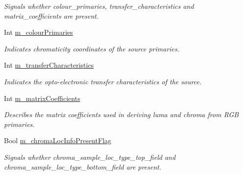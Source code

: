 \begin{DoxyCompactItemize}
\begin{DoxyCompactList}\small\item\em Signals whether colour\+\_\+primaries, transfer\+\_\+characteristics and matrix\+\_\+coefficients are present. \end{DoxyCompactList}\item 
\mbox{\label{class_t_enc_cfg_a280f8ebc530fa86353079d18fa54162c}} 
Int \hyperlink{class_t_enc_cfg_a280f8ebc530fa86353079d18fa54162c}{m\+\_\+colour\+Primaries}
\begin{DoxyCompactList}\small\item\em Indicates chromaticity coordinates of the source primaries. \end{DoxyCompactList}\item 
\mbox{\label{class_t_enc_cfg_af7e8035e2632c6a0cad7f54855f1dc1d}} 
Int \hyperlink{class_t_enc_cfg_af7e8035e2632c6a0cad7f54855f1dc1d}{m\+\_\+transfer\+Characteristics}
\begin{DoxyCompactList}\small\item\em Indicates the opto-\/electronic transfer characteristics of the source. \end{DoxyCompactList}\item 
\mbox{\label{class_t_enc_cfg_a857671642531f88fa45db9235cfac9dc}} 
Int \hyperlink{class_t_enc_cfg_a857671642531f88fa45db9235cfac9dc}{m\+\_\+matrix\+Coefficients}
\begin{DoxyCompactList}\small\item\em Describes the matrix coefficients used in deriving luma and chroma from R\+GB primaries. \end{DoxyCompactList}\item 
\mbox{\label{class_t_enc_cfg_a02b742a2da501d13f927e8cf2dc22e59}} 
Bool \hyperlink{class_t_enc_cfg_a02b742a2da501d13f927e8cf2dc22e59}{m\+\_\+chroma\+Loc\+Info\+Present\+Flag}
\begin{DoxyCompactList}\small\item\em Signals whether chroma\+\_\+sample\+\_\+loc\+\_\+type\+\_\+top\+\_\+field and chroma\+\_\+sample\+\_\+loc\+\_\+type\+\_\+bottom\+\_\+field are present. \end{DoxyCompactList}\item 
\mbox{\label{class_t_enc_cfg_a53b6c072a4dd9e4bc1953203688395c6}} 

\end{DoxyCompactItemize}
